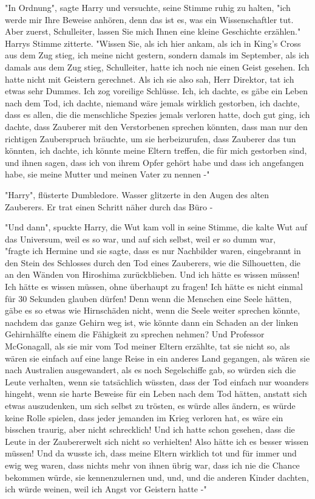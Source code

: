 {"In Ordnung", sagte Harry und versuchte, seine Stimme ruhig zu halten, "ich werde mir Ihre Beweise anhören, denn das ist es, was ein Wissenschaftler tut. Aber zuerst, Schulleiter, lassen Sie mich Ihnen eine kleine Geschichte erzählen." Harrys Stimme zitterte. "Wissen Sie, als ich hier ankam, als ich in King's Cross aus dem Zug stieg, ich meine nicht gestern, sondern damals im September, als ich damals aus dem Zug stieg, Schulleiter, hatte ich noch nie einen Geist gesehen. Ich hatte nicht mit Geistern gerechnet. Als ich sie also sah, Herr Direktor, tat ich etwas sehr Dummes. Ich zog voreilige Schlüsse. Ich, ich dachte, es gäbe ein Leben nach dem Tod, ich dachte, niemand wäre jemals wirklich gestorben, ich dachte, dass es allen, die die menschliche Spezies jemals verloren hatte, doch gut ging, ich dachte, dass Zauberer mit den Verstorbenen sprechen könnten, dass man nur den richtigen Zauberspruch bräuchte, um sie herbeizurufen, dass Zauberer das tun könnten, ich dachte, ich könnte meine Eltern treffen, die für mich gestorben sind, und ihnen sagen, dass ich von ihrem Opfer gehört habe und dass ich angefangen habe, sie meine Mutter und meinen Vater zu nennen -"

"Harry", flüsterte Dumbledore. Wasser glitzerte in den Augen des alten Zauberers. Er trat einen Schritt näher durch das Büro -

"Und dann", spuckte Harry, die Wut kam voll in seine Stimme, die kalte Wut auf das Universum, weil es so war, und auf sich selbst, weil er so dumm war,\\ "fragte ich Hermine und sie sagte, dass es nur Nachbilder waren, eingebrannt in den Stein des Schlosses durch den Tod eines Zauberers, wie die Silhouetten, die an den Wänden von Hiroshima zurückblieben. Und ich hätte es wissen müssen! Ich hätte es wissen müssen, ohne überhaupt zu fragen! Ich hätte es nicht einmal für 30 Sekunden glauben dürfen! Denn wenn die Menschen eine Seele hätten, gäbe es so etwas wie Hirnschäden nicht, wenn die Seele weiter sprechen könnte, nachdem das ganze Gehirn weg ist, wie könnte dann ein Schaden an der linken Gehirnhälfte einem die Fähigkeit zu sprechen nehmen? Und Professor McGonagall, als sie mir vom Tod meiner Eltern erzählte, tat sie nicht so, als wären sie einfach auf eine lange Reise in ein anderes Land gegangen, als wären sie nach Australien ausgewandert, als es noch Segelschiffe gab, so würden sich die Leute verhalten, wenn sie tatsächlich wüssten, dass der Tod einfach nur woanders hingeht, wenn sie harte Beweise für ein Leben nach dem Tod hätten, anstatt sich etwas auszudenken, um sich selbst zu trösten, es würde alles ändern, es würde keine Rolle spielen, dass jeder jemanden im Krieg verloren hat, es wäre ein bisschen traurig, aber nicht schrecklich! Und ich hatte schon gesehen, dass die Leute in der Zaubererwelt sich nicht so verhielten! Also hätte ich es besser wissen müssen! Und da wusste ich, dass meine Eltern wirklich tot und für immer und ewig weg waren, dass nichts mehr von ihnen übrig war, dass ich nie die Chance bekommen würde, sie kennenzulernen und, und, und die anderen Kinder dachten, ich würde weinen, weil ich Angst vor Geistern hatte -"

}
